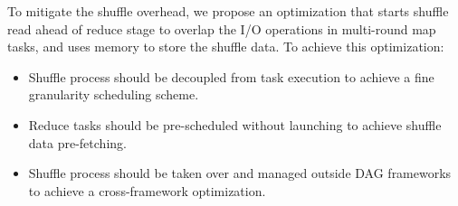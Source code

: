 To mitigate the shuffle overhead, we propose an optimization that starts shuffle read ahead of reduce stage to overlap the I/O operations in multi-round map tasks, and uses memory to store the shuffle data. 
To achieve this optimization:
\begin{itemize}
	\item Shuffle process should be decoupled from task execution to achieve a fine granularity scheduling scheme.
	\item Reduce tasks should be pre-scheduled without launching to achieve shuffle data pre-fetching.
	\item Shuffle process should be taken over and managed outside DAG frameworks to achieve a cross-framework optimization.
\end{itemize}
